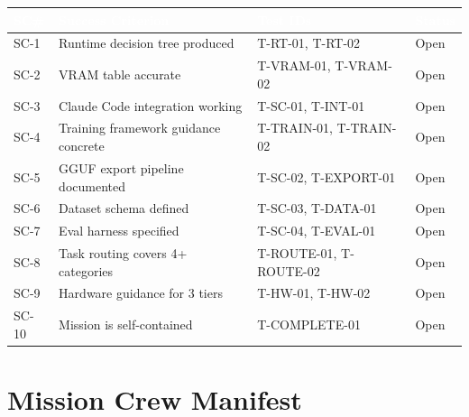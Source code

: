 \documentclass[11pt,letterpaper]{article}
\newcommand{\tableheader}[1]{\textbf{\sffamily\textcolor{white}{#1}}}
\begin{document}
\begin{center}
\begin{tabularx}{\textwidth}{L{1cm}L{4cm}L{3cm}C{2cm}}
\toprule
{}
\tableheader{SC\#} & \tableheader{Success Criterion} & \tableheader{Test IDs} & \tableheader{Status} \\
\midrule
SC-1 & Runtime decision tree produced & T-RT-01, T-RT-02 & Open \\
SC-2 & VRAM table accurate & T-VRAM-01, T-VRAM-02 & Open \\
SC-3 & Claude Code integration working & T-SC-01, T-INT-01 & Open \\
SC-4 & Training framework guidance concrete & T-TRAIN-01, T-TRAIN-02 & Open \\
SC-5 & GGUF export pipeline documented & T-SC-02, T-EXPORT-01 & Open \\
SC-6 & Dataset schema defined & T-SC-03, T-DATA-01 & Open \\
SC-7 & Eval harness specified & T-SC-04, T-EVAL-01 & Open \\
SC-8 & Task routing covers 4+ categories & T-ROUTE-01, T-ROUTE-02 & Open \\
SC-9 & Hardware guidance for 3 tiers & T-HW-01, T-HW-02 & Open \\
SC-10 & Mission is self-contained & T-COMPLETE-01 & Open \\
\bottomrule
\end{tabularx}
\end{center}

\section{Mission Crew Manifest}
\end{document}
